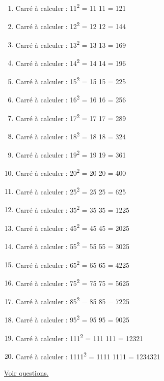 \documentclass[11pt]{article}
\begin{document}
\label{org4a3537c}


\begin{enumerate}
\item Carré à calculer : 11\textsuperscript{2} = 11 \texttimes{} 11 = 121
\item Carré à calculer : 12\textsuperscript{2} = 12 \texttimes{} 12 = 144
\item Carré à calculer : 13\textsuperscript{2} = 13 \texttimes{} 13 = 169
\item Carré à calculer : 14\textsuperscript{2} = 14 \texttimes{} 14 = 196
\item Carré à calculer : 15\textsuperscript{2} = 15 \texttimes{} 15 = 225
\item Carré à calculer : 16\textsuperscript{2} = 16 \texttimes{} 16 = 256
\item Carré à calculer : 17\textsuperscript{2} = 17 \texttimes{} 17 = 289
\item Carré à calculer : 18\textsuperscript{2} = 18 \texttimes{} 18 = 324
\item Carré à calculer : 19\textsuperscript{2} = 19 \texttimes{} 19 = 361
\item Carré à calculer : 20\textsuperscript{2} = 20 \texttimes{} 20 = 400
\item Carré à calculer : 25\textsuperscript{2} = 25 \texttimes{} 25 =  625
\item Carré à calculer : 35\textsuperscript{2} = 35 \texttimes{} 35 = 1225
\item Carré à calculer : 45\textsuperscript{2} = 45 \texttimes{} 45 = 2025
\item Carré à calculer : 55\textsuperscript{2} = 55 \texttimes{} 55 = 3025
\item Carré à calculer : 65\textsuperscript{2} = 65 \texttimes{} 65 = 4225
\item Carré à calculer : 75\textsuperscript{2} = 75 \texttimes{} 75 = 5625
\item Carré à calculer : 85\textsuperscript{2} = 85 \texttimes{} 85 = 7225
\item Carré à calculer : 95\textsuperscript{2} = 95 \texttimes{} 95 = 9025
\item Carré à calculer : 111\textsuperscript{2} = 111 \texttimes{} 111 = 12321
\item Carré à calculer : 1111\textsuperscript{2} = 1111 \texttimes{} 1111 = 1234321
\end{enumerate}



\hyperref[org529dbcb]{Voir questions.}
\end{document}
